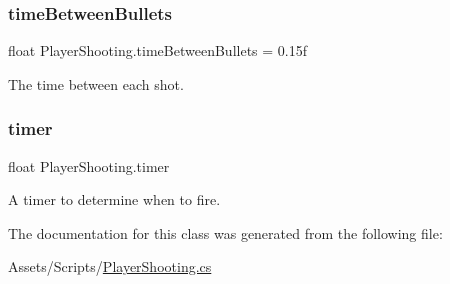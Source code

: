 \subsubsection{\texorpdfstring{timeBetweenBullets}{timeBetweenBullets}}
{\footnotesize\ttfamily float Player\+Shooting.\+time\+Between\+Bullets = 0.\+15f}

The time between each shot. \mbox{\label{class_player_shooting_a5ad5135f9bd4b04ae8cad70e0533d468}} 
\subsubsection{\texorpdfstring{timer}{timer}}
{\footnotesize\ttfamily float Player\+Shooting.\+timer\hspace{0.3cm}{\ttfamily [private]}}

A timer to determine when to fire. 

The documentation for this class was generated from the following file\+:\begin{DoxyCompactItemize}
\item 
Assets/\+Scripts/\mbox{\hyperlink{_player_shooting_8cs}{Player\+Shooting.\+cs}}\end{DoxyCompactItemize}
